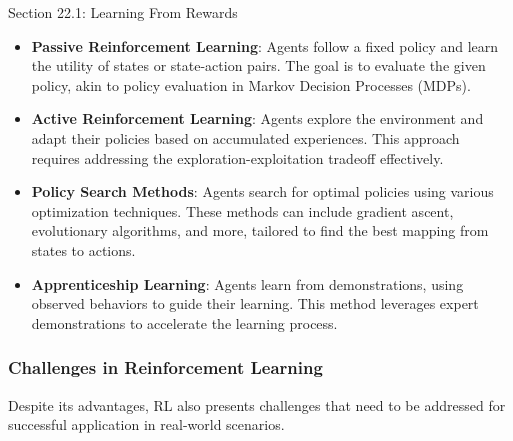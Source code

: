 \begin{notes}{Section 22.1: Learning From Rewards}
\begin{highlight}
        \begin{itemize}
            \item \textbf{Passive Reinforcement Learning}: Agents follow a fixed policy and learn the utility of states or state-action pairs. The goal is to evaluate the given policy, akin to policy 
            evaluation in Markov Decision Processes (MDPs).
            \item \textbf{Active Reinforcement Learning}: Agents explore the environment and adapt their policies based on accumulated experiences. This approach requires addressing the exploration-exploitation 
            tradeoff effectively.
            \item \textbf{Policy Search Methods}: Agents search for optimal policies using various optimization techniques. These methods can include gradient ascent, evolutionary algorithms, and more, 
            tailored to find the best mapping from states to actions.
            \item \textbf{Apprenticeship Learning}: Agents learn from demonstrations, using observed behaviors to guide their learning. This method leverages expert demonstrations to accelerate the learning 
            process.
        \end{itemize}
    
    \end{highlight}
    
    \subsubsection*{Challenges in Reinforcement Learning}
    
    Despite its advantages, RL also presents challenges that need to be addressed for successful application in real-world scenarios.
    
    \begin{highlight}
    

\end{highlight}
\end{notes}
